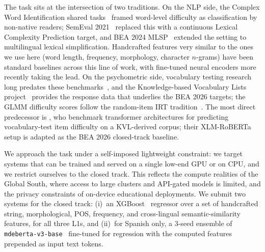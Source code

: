 \documentclass[11pt]{article}
\begin{document}
The task sits at the intersection of two traditions. On the NLP side, the Complex Word Identification shared tasks~\citep{paetzold-specia-2016-semeval,yimam-etal-2018-report} framed word-level difficulty as classification by non-native readers; SemEval 2021~\citep{shardlow-etal-2021-semeval} replaced this with a continuous Lexical Complexity Prediction target, and BEA 2024 MLSP~\citep{shardlow-etal-2024-bea} extended the setting to multilingual lexical simplification. Handcrafted features very similar to the ones we use here (word length, frequency, morphology, character $n$-grams) have been standard baselines across this line of work, with fine-tuned neural encoders more recently taking the lead. On the psychometric side, vocabulary testing research long predates these benchmarks~\citep{laufer2004testing}, and the Knowledge-based Vocabulary Lists project~\citep{schmitt2021kvl,schmitt2024kvl} provides the response data that underlies the BEA 2026 targets; the GLMM difficulty scores follow the random-item IRT tradition~\citep{deboeck2008rirt,dunn2024rasch}. The most direct predecessor is \citet{skidmore-etal-2025-transformer}, who benchmark transformer architectures for predicting vocabulary-test item difficulty on a KVL-derived corpus; their XLM-RoBERTa setup is adapted as the BEA 2026 closed-track baseline.

We approach the task under a self-imposed lightweight constraint: we target systems that can be trained and served on a single low-end GPU or on CPU, and we restrict ourselves to the closed track. This reflects the compute realities of the Global South, where access to large clusters and API-gated models is limited, and the privacy constraints of on-device educational deployments. We submit two systems for the closed track: (i)~an XGBoost~\citep{chen2016xgboost} regressor over a set of handcrafted string, morphological, POS, frequency, and cross-lingual semantic-similarity features, for all three L1s, and (ii)~for Spanish only, a 3-seed ensemble of \texttt{mdeberta-v3-base}~\citep{he2023debertav3} fine-tuned for regression with the computed features prepended as input text tokens.
\end{document}

